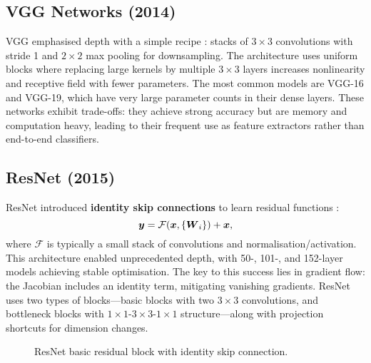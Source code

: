 \subsection{VGG Networks (2014)}

VGG emphasised depth with a simple recipe \cite{GoodfellowEtAl2016}: stacks of $3\times3$ convolutions with stride 1 and $2\times2$ max pooling for downsampling. The architecture uses uniform blocks where replacing large kernels by multiple $3\times3$ layers increases nonlinearity and receptive field with fewer parameters. The most common models are VGG-16 and VGG-19, which have very large parameter counts in their dense layers. These networks exhibit trade-offs: they achieve strong accuracy but are memory and computation heavy, leading to their frequent use as feature extractors rather than end-to-end classifiers.

\subsection{ResNet (2015)}
\label{subsec:resnet}

ResNet introduced \textbf{identity skip connections} to learn residual functions \cite{He2016}:
\begin{equation}
\boldsymbol{y} = \mathcal{F}(\boldsymbol{x}, \{\boldsymbol{W}_i\}) + \boldsymbol{x},
\end{equation}
where $\mathcal{F}$ is typically a small stack of convolutions and normalisation/activation. This architecture enabled unprecedented depth, with 50-, 101-, and 152-layer models achieving stable optimisation. The key to this success lies in gradient flow: the Jacobian includes an identity term, mitigating vanishing gradients. ResNet uses two types of blocks—basic blocks with two $3\times3$ convolutions, and bottleneck blocks with $1\times1$-$3\times3$-$1\times1$ structure—along with projection shortcuts for dimension changes.

\begin{figure}[h]
    \centering
    \caption{ResNet basic residual block with identity skip connection.}
    \label{fig:resnet-block}
\end{figure}

